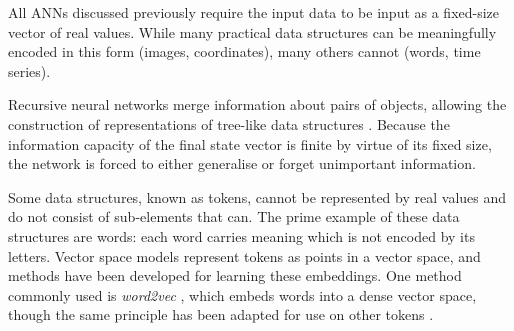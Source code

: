 \documentclass[../../main.tex]{subfiles}
\begin{document}
All ANNs discussed previously require the input data to be input as a fixed-size vector of real values.
While many practical data structures can be meaningfully encoded in this form (images, coordinates), many others cannot (words, time series).

Recursive neural networks merge information about pairs of objects, allowing the construction of representations of tree-like data structures \cite{socher11}.
Because the information capacity of the final state vector is finite by virtue of its fixed size, the network is forced to either generalise or forget unimportant information.

Some data structures, known as tokens, cannot be represented by real values and do not consist of sub-elements that can.
The prime example of these data structures are words: each word carries meaning which is not encoded by its letters.
Vector space models represent tokens as points in a vector space, and methods have been developed for learning these embeddings.
One method commonly used is \emph{word2vec} \cite{mikolov13}, which embeds words into a dense vector space, though the same principle has been adapted for use on other tokens \cite{le14}.
\end{document}
